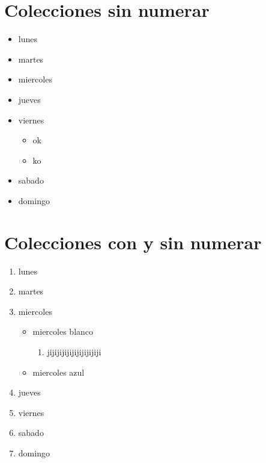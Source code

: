 \documentclass[10pt,a4paper]{article}
\begin{document}
\section{Colecciones sin numerar}
\begin{itemize}
\item lunes
\item martes
\item miercoles
\item jueves
\item viernes
	\begin{itemize}
	\item ok
	\item ko
	\end{itemize}
\item sabado
\item domingo	
\end{itemize}

\section{Colecciones con y sin numerar}
\begin{enumerate}
\item lunes
\item martes
\item miercoles
	\begin{itemize}
	\item miercoles blanco
		\begin{enumerate}
        \item jijijijijijijijijijiji		
		\end{enumerate}
	\item miercoles azul	
	\end{itemize}
\item jueves
\item viernes
\item sabado
\item domingo	
\end{enumerate}
\end{document}
